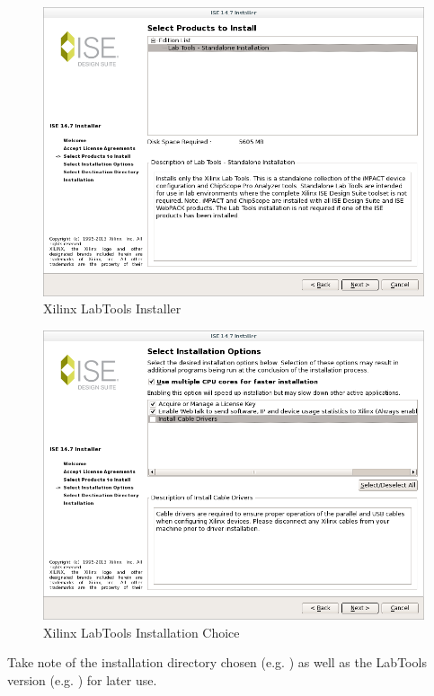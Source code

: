 \begin{flushleft}
\begin{flushleft}
\begin{enumerate}
\begin{figure}[H]
	\centerline{\includegraphics[scale=0.4]{figures/xilinx_labtools_install}}
	\caption{Xilinx LabTools Installer}
\end{figure}
\begin{figure}[H]
	\centerline{\includegraphics[scale=0.4]{figures/xilinx_labtools_choose_installation}}
	\caption{Xilinx LabTools Installation Choice}
\end{figure}
\pagebreak
Take note of the installation directory chosen (e.g. ) as well as the LabTools version (e.g. ) for later use.
\begin{figure}[H]

\end{figure}
\end{enumerate}
\end{flushleft}
\end{flushleft}

